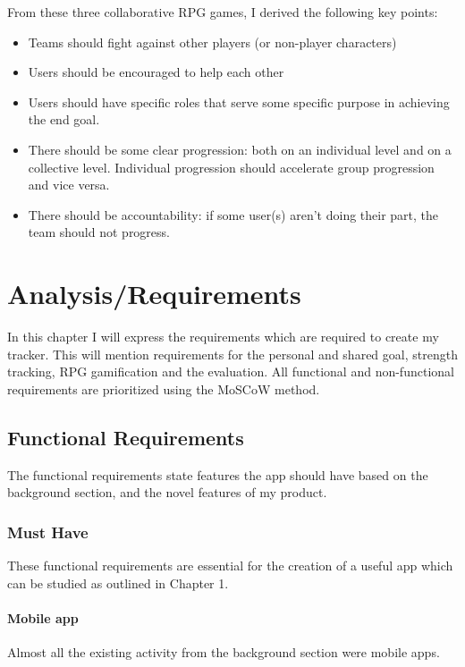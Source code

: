 \documentclass{l4proj}
\begin{document}
From these three collaborative RPG games, I derived the following key points:
\begin{itemize}    
    \item
      Teams should fight against other players (or non-player characters)
    \item
      Users should be encouraged to help each other
    \item
      Users should have specific roles that serve some specific purpose in achieving the end goal.
    \item 
      There should be some clear progression: both on an individual level and on a collective level. Individual progression should accelerate group progression and vice versa.
    \item 
      There should be accountability: if some user(s) aren't doing their part, the team should not progress.
\end{itemize}


\chapter{Analysis/Requirements}
In this chapter I will express the requirements which are required to create my tracker. This will mention requirements for the personal and shared goal, strength tracking, RPG gamification and the evaluation. All functional and non-functional requirements are prioritized using the MoSCoW method.

\section{Functional Requirements}
The functional requirements state features the app should have based on the background section, and the novel features of my product.

\subsection{Must Have}
  These functional requirements are essential for the creation of a useful app which can be studied as outlined in Chapter 1.

  \subsubsection{Mobile app} Almost all the existing activity from the background section were mobile apps. 
\end{document}
